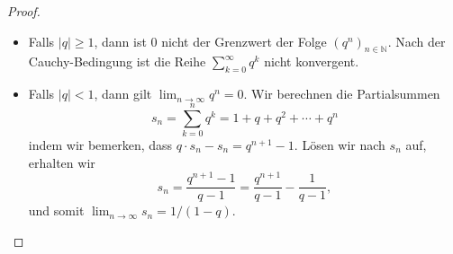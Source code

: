 \documentclass[../main.tex]{subfiles}
\begin{document}
\begin{proof}
  \leavevmode
  \begin{itemize}
    \item Falls $|q| \geq 1$, dann ist $0$ nicht
      der Grenzwert der Folge ${(q^n)}_{n \in \mathbb{N}}$.
      Nach der Cauchy-Bedingung ist die Reihe
      $\sum_{k=0}^{\infty} q^k$ nicht konvergent.
    \item Falls $|q|<1$, dann gilt
      $\lim_{n \to \infty} q^n = 0$. Wir berechnen
      die Partialsummen
      \[
        s_n =  \sum_{k=0}^{n} q^k 
            = 1 + q + q^2 + \cdots + q^n
      \]
      indem wir bemerken, dass
      \(
        q \cdot s_n - s_n = q^{n+1} - 1.
      \)
      Lösen wir nach $s_n$ auf, erhalten wir
      \[
        s_n = \frac{q^{n+1} - 1}{q - 1}
        = \frac{q^{n+1}}{q-1} - \frac{1}{q-1},
      \]
      und somit
      \(
        \lim_{n \to \infty} s_n = {1}/(1-q)
      \).\qedhere
  \end{itemize}
\end{proof}
\end{document}
